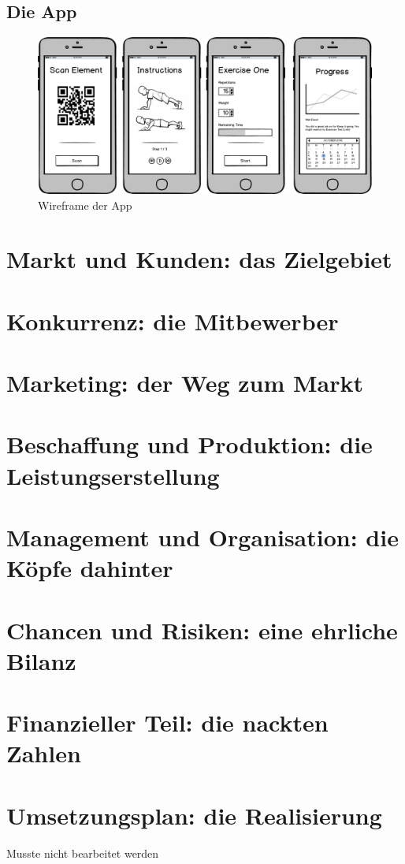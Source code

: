 \subsection{Die App}
\begin{figure}[h]
\centering
\includegraphics[width=0.5\linewidth]{images/app}
\caption{Wireframe der App}
\label{fig:app}
\end{figure}


\section{Markt und Kunden: das Zielgebiet}

\section{Konkurrenz: die Mitbewerber}

\section{Marketing: der Weg zum Markt}

\section{Beschaffung und Produktion: die Leistungserstellung}

\section{Management und Organisation: die Köpfe dahinter}

\section{Chancen und Risiken: eine ehrliche Bilanz}

\section{Finanzieller Teil: die nackten Zahlen}


\section{Umsetzungsplan: die Realisierung}
Musste nicht bearbeitet werden

